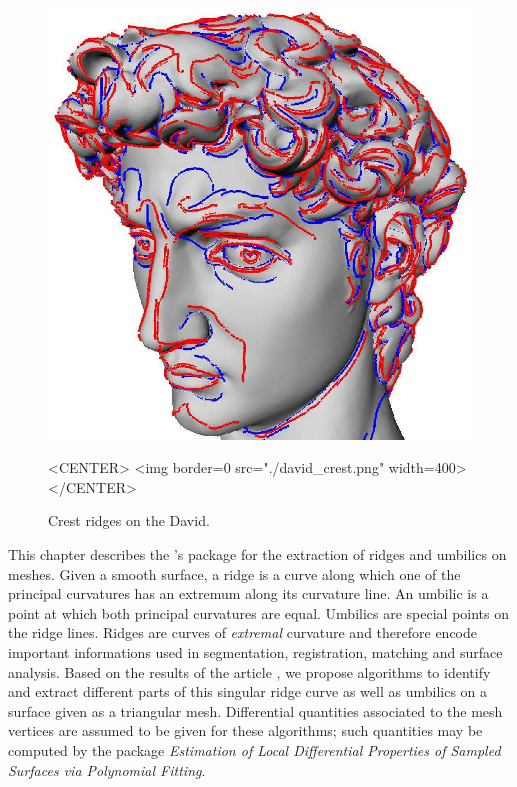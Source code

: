 



\newcommand{\FC}[1]{\protect{===FC SAYS: {#1}}}



\newtheorem{definition}{Definition.}
\newcommand{\hot}{h.o.t}%


\begin{figure}[!ht]
\begin{ccTexOnly}
\centerline{
\includegraphics[width=.5\linewidth]{Ridges_3/david_crest}}
\end{ccTexOnly}
\caption{Crest ridges on the David.}
\label{david_crest}
\begin{ccHtmlOnly}
<CENTER> <img border=0 src="./david_crest.png" width=400>
</CENTER>
\end{ccHtmlOnly}
\end{figure}

This chapter describes the \cgal's package for the extraction of
ridges and umbilics on meshes.  Given a smooth surface, a ridge is a
curve along which one of the principal curvatures has an extremum
along its curvature line. An umbilic is a point at which both
principal curvatures are equal. Umbilics are special points on the
ridge lines. Ridges are curves of {\em extremal} curvature and
therefore encode important informations used in segmentation,
registration, matching and surface analysis.  Based on the results of
the article \cite{cgal:cp-tdare-05}, we propose algorithms to identify
and extract different parts of this singular ridge curve as well as
umbilics on a surface given as a triangular mesh. Differential
quantities associated to the mesh vertices are assumed to be given for
these algorithms; such quantities may be computed by the package {\em
Estimation of Local Differential Properties of Sampled Surfaces via
Polynomial Fitting}.


